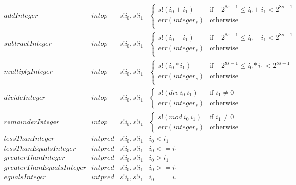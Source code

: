 \documentclass[../main.tex]{subfiles}
\begin{document}
\begin{figure*}[t]
\[\begin{array}{lllll}
        addInteger        &  intop  &  s!i_0 , s!i_1   & \begin{cases}
          s!(i_0 + i_1)                     & \text{if $-2^{8s-1} \leq i_0 + i_1 < 2^{8s-1}$}\\
          err(integer_s)  & \text{otherwise}\\
        \end{cases} \\
        subtractInteger   &  intop  &  s!i_0 , s!i_1 & \begin{cases}
          s!(i_0 - i_1)                     & \text{if $-2^{8s-1} \leq i_0 - i_1 < 2^{8s-1}$}\\
          err(integer_s)  & \text{otherwise}\\
        \end{cases} \\
        multiplyInteger   &  intop  &  s!i_0 , s!i_1   & \begin{cases}
          s!(i_0 * i_1)                     & \text{if $-2^{8s-1} \leq i_0 * i_1 < 2^{8s-1}$}\\
          err(integer_s)  & \text{otherwise}\\
        \end{cases} \\
        divideInteger     &  intop  &  s!i_0 , s!i_1   & \begin{cases}
          s!(div \  i_0 \  i_1)                     & \text{if $i_1 \not= 0$}\\
          err(integer_s)  & \text{otherwise}
        \end{cases}\\
        remainderInteger  &  intop  &  s!i_0 , s!i_1   & \begin{cases}
          s!(mod \  i_0 \  i_1)                     & \text{if $i_1 \not= 0$}\\
          err(integer_s)  & \text{otherwise}
        \end{cases}\\
        
        lessThanInteger            &  intpred  &  s!i_0 , s!i_1   &   i_0 < i_1\\
        lessThanEqualsInteger      &  intpred  &  s!i_0 , s!i_1   &   i_0 <= i_1\\
        greaterThanInteger         &  intpred  &  s!i_0 , s!i_1   &   i_0 > i_1\\
        greaterThanEqualsInteger   &  intpred  &  s!i_0 , s!i_1   &   i_0 >= i_1\\
        equalsInteger              &  intpred  &  s!i_0 , s!i_1   &   i_0 == i_1\\
        

\end{array}\]
\end{figure*}
\end{document}
